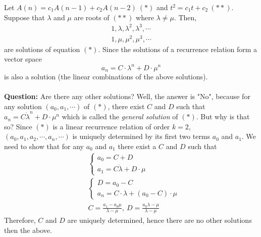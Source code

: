 Let $A(n)=c_1 A(n-1) + c_2 A(n-2)\ (*)$ and $t^2=c_1t +c_2\ (**)$. Suppose that $\lambda$ and $\mu$ are roots of $(**)$ where $\lambda \neq \mu$.
Then, 
\begin{align*}
1, \lambda, \lambda^2, \lambda^3, \cdots \\
1, \mu, \mu^2, \mu^3, \cdots
\end{align*}
are solutions of equation $(*)$. Since the solutions of a recurrence relation form a vector space 
$$
a_n=C \cdot \lambda^n + D \cdot \mu^n 
$$
is also a solution (the linear combinations of the above solutions).\\\\
\textbf{Question:} Are there any other solutions? 
\newpage
Well, the answer is "No", because for any solution $(a_0, a_1, \cdots)$ of $(*)$, there exist $C$
 and $D$ such that $a_n=C \dot \lambda^n + D \cdot \mu^n$ which is called the \textit{general solution} of $(*)$. But why is that so?
Since $(*)$ is a linear recurrence relation of order $k=2$, $(a_0, a_1, a_2, \cdots, a_n, \cdots)$ is uniquely determined by its first two terms $a_0$ and $a_1$.
We need to show that for any $a_0$ and $a_1$ there exist a $C$ and $D$ such that
\begin{align*}
&\begin{cases}
    a_0 = C + D\\    
    a_1 = C \dot \lambda + D \cdot \mu   
\end{cases}\\
&\begin{cases}
    D = a_0 - C\\    
    a_n = C \cdot \lambda + (a_0 - C) \cdot \mu   
\end{cases}\\
&
C=\frac{a_1 - a_0 \mu}{\lambda - \mu},\ D=\frac{a_0 \lambda - \mu}{\lambda - \mu} 
\end{align*}
\noindent
Therefore, $C$ and $D$ are uniquely determined, hence there are no other solutions then the above.

